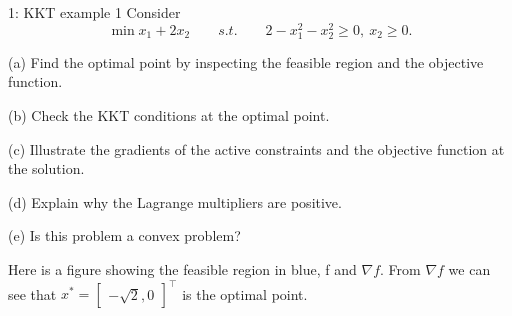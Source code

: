 
\begin{problem}{1: KKT example 1}
Consider
\[
  \min x_1 + 2x_2 \qquad s.t. \qquad 2 - x_1^2-x_2^2 \geq 0 ,\ x_2 \geq 0
  .\]

(a) Find the optimal point by inspecting the feasible region and the objective function.

\medskip

(b) Check the KKT conditions at the optimal point.

\medskip

(c) Illustrate the gradients of the active constraints and the objective function at the solution.

\medskip

(d) Explain why the Lagrange multipliers are positive.

\medskip

(e) Is this problem a convex problem?

\end{problem}



Here is a figure showing the feasible region in blue, f and $\nabla f$. From $\nabla f$ we can see that $x^{*} = \begin{bmatrix}
    -\sqrt{2}, 0
  \end{bmatrix}^{\top}$ is the optimal point.

